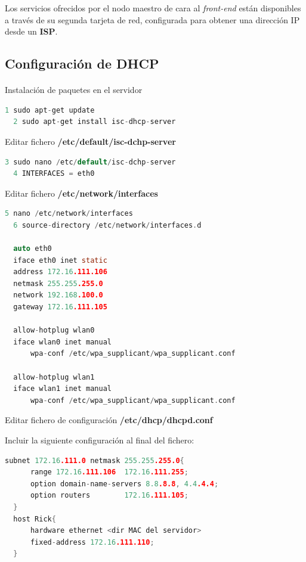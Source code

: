 Los servicios ofrecidos por el nodo maestro de cara al \textit{front-end} están disponibles a través de su segunda tarjeta de red, configurada para obtener una dirección IP desde un \textbf{ISP}.

\subsection{Configuración de DHCP}
\paragraph{}

Instalación de paquetes en el servidor

\begin{lstlisting}[language=c,frame=single,numbers=none]
  1	sudo apt-get update
  2	sudo apt-get install isc-dhcp-server
\end{lstlisting}

Editar fichero \textbf{/etc/default/isc-dchp-server}

\begin{lstlisting}[language=c,frame=single,numbers=none]
  3	sudo nano /etc/default/isc-dchp-server
  4	INTERFACES = eth0
\end{lstlisting}

Editar fichero \textbf{/etc/network/interfaces}

\begin{lstlisting}[language=c,frame=single,numbers=none]
  5	nano /etc/network/interfaces
  6	source-directory /etc/network/interfaces.d

  auto eth0	
  iface eth0 inet static
  address 172.16.111.106
  netmask 255.255.255.0
  network 192.168.100.0
  gateway 172.16.111.105

  allow-hotplug wlan0
  iface wlan0 inet manual
      wpa-conf /etc/wpa_supplicant/wpa_supplicant.conf

  allow-hotplug wlan1
  iface wlan1 inet manual
      wpa-conf /etc/wpa_supplicant/wpa_supplicant.conf
\end{lstlisting}

Editar fichero de configuración \textbf{/etc/dhcp/dhcpd.conf}

Incluir la siguiente configuración al final del fichero:
\begin{lstlisting}[language=c,frame=single,numbers=none]
  subnet 172.16.111.0 netmask 255.255.255.0{
      range 172.16.111.106	172.16.111.255;
      option domain-name-servers 8.8.8.8, 4.4.4.4;
      option routers		172.16.111.105;
  }
  host Rick{
      hardware ethernet <dir MAC del servidor>
      fixed-address 172.16.111.110;
  }
\end{lstlisting}

